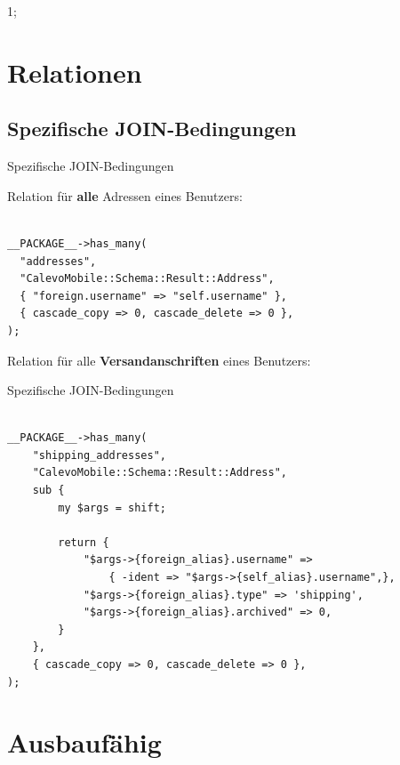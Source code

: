 1;

\section{Relationen}

\subsection{Spezifische JOIN-Bedingungen}

\begin{frame}[fragile]{Spezifische JOIN-Bedingungen}

Relation für \textbf{alle} Adressen eines Benutzers:

\begin{lstlisting}

__PACKAGE__->has_many(
  "addresses",
  "CalevoMobile::Schema::Result::Address",
  { "foreign.username" => "self.username" },
  { cascade_copy => 0, cascade_delete => 0 },
);

\end{lstlisting}
\end{frame}

Relation für alle \textbf{Versandanschriften} eines Benutzers:

\begin{frame}[fragile]{Spezifische JOIN-Bedingungen}
\begin{lstlisting}

__PACKAGE__->has_many(
    "shipping_addresses",
    "CalevoMobile::Schema::Result::Address",
    sub {
        my $args = shift;

        return {
            "$args->{foreign_alias}.username" =>
                { -ident => "$args->{self_alias}.username",},
            "$args->{foreign_alias}.type" => 'shipping',
            "$args->{foreign_alias}.archived" => 0,
        }
    },
    { cascade_copy => 0, cascade_delete => 0 },
);
\end{lstlisting}
\end{frame}


\section{Ausbaufähig}

